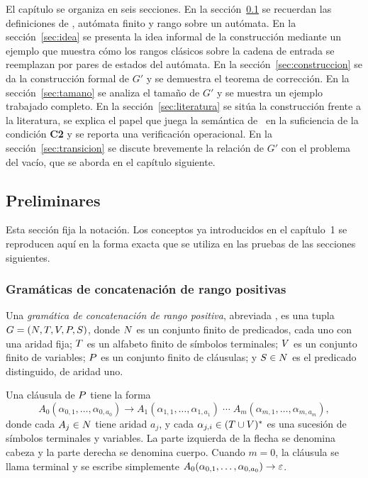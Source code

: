 El capítulo se organiza en seis secciones. En la sección~\ref{sec:preliminares} se recuerdan las definiciones de \PRCG, autómata finito y rango sobre un autómata. En la sección~\ref{sec:idea} se presenta la idea informal de la construcción mediante un ejemplo que muestra cómo los rangos clásicos sobre la cadena de entrada se reemplazan por pares de estados del autómata. En la sección~\ref{sec:construccion} se da la construcción formal de $G'$ y se demuestra el teorema de corrección. En la sección~\ref{sec:tamano} se analiza el tamaño de $G'$ y se muestra un ejemplo trabajado completo. En la sección~\ref{sec:literatura} se sitúa la construcción frente a la literatura, se explica el papel que juega la semántica de \PRCG\ en la suficiencia de la condición \textbf{C2} y se reporta una verificación operacional. En la sección~\ref{sec:transicion} se discute brevemente la relación de $G'$ con el problema del vacío, que se aborda en el capítulo siguiente.

\subsection{Preliminares}\label{sec:preliminares}

Esta sección fija la notación. Los conceptos ya introducidos en el capítulo~1 se reproducen aquí en la forma exacta que se utiliza en las pruebas de las secciones siguientes.

\subsubsection{Gramáticas de concatenación de rango positivas}

Una \emph{gramática de concatenación de rango positiva}, abreviada \PRCG, es una tupla $G = (N, T, V, P, S)$, donde $N$ es un conjunto finito de predicados, cada uno con una aridad fija; $T$ es un alfabeto finito de símbolos terminales; $V$ es un conjunto finito de variables; $P$ es un conjunto finito de cláusulas; y $S \in N$ es el predicado distinguido, de aridad uno.

Una cláusula de $P$ tiene la forma
\[
A_0(\alpha_{0,1}, \dots, \alpha_{0, a_0}) \to A_1(\alpha_{1,1}, \dots, \alpha_{1, a_1}) \; \cdots \; A_m(\alpha_{m,1}, \dots, \alpha_{m, a_m}),
\]
donde cada $A_j \in N$ tiene aridad $a_j$, y cada $\alpha_{j,i} \in (T \cup V)^{*}$ es una sucesión de símbolos terminales y variables. La parte izquierda de la flecha se denomina cabeza y la parte derecha se denomina cuerpo. Cuando $m = 0$, la cláusula se llama terminal y se escribe simplemente $A_0(\alpha_{0,1}, \dots, \alpha_{0, a_0}) \to \varepsilon$.

